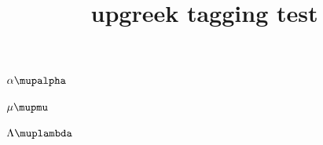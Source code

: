 \documentclass{article}
\title{upgreek tagging test}
\def\Uplambda{\muplambda}
\def\upalpha{\mupalpha}
\def\upmu{\mupmu}
\begin{document}
$\alpha\upalpha$

$\mu\upmu$

$\Lambda\Uplambda$
\end{document}
